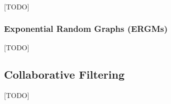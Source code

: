 \subsubsection{\erdos \renyi}
[TODO]



\subsubsection{Exponential Random Graphs (ERGMs)}
[TODO]


\begin{remark}
\end{remark}


\subsection{Collaborative Filtering}
\label{sec:collaborative_filtering}
[TODO]
